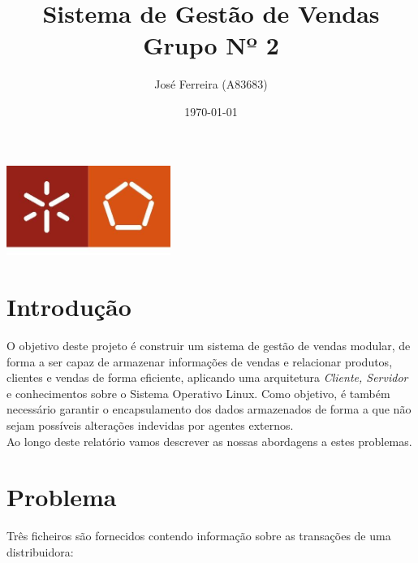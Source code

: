 \documentclass[a4paper]{report}
\begin{document}
\title{Sistema de Gestão de Vendas\\ 
\large Grupo Nº 2}
\author{José Ferreira (A83683)}
\date{\today}

\begin{center}
    \begin{minipage}{0.75\linewidth}
        \centering
        \includegraphics[width=0.4\textwidth]{eng.jpeg}\par\vspace{1cm}
        \vspace{1.5cm}
        \href{https://www.uminho.pt/PT}
        {\color{black}{\scshape\LARGE Universidade do Minho}} \par
        \vspace{1cm}
        \href{https://www.di.uminho.pt/}
        {\color{black}{\scshape\Large Departamento de Informática}} \par
        \vspace{1.5cm}
        \maketitle
    \end{minipage}
\end{center}

\tableofcontents

\pagebreak

\chapter{Introdução}

O objetivo deste projeto é construir um sistema de gestão de vendas modular,
de forma a ser capaz de armazenar informações de vendas e relacionar produtos,
clientes e vendas de forma eficiente, aplicando uma arquitetura \textit{Cliente,
Servidor} e conhecimentos sobre o Sistema Operativo Linux. Como objetivo, 
é também necessário garantir o encapsulamento dos dados armazenados de forma
a que não sejam possíveis alterações indevidas por agentes externos.\\
Ao longo deste relatório vamos descrever as nossas abordagens a estes problemas.

\chapter{Problema}
Três ficheiros são fornecidos contendo informação sobre as transações de uma distribuidora:
\end{document}
